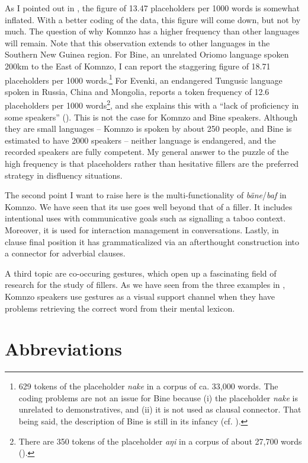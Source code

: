 \documentclass[output=paper,colorlinks,citecolor=brown]{langscibook}
\begin{document}
As I pointed out in , the figure of 13.47 placeholders per 1000 words is somewhat inflated. With a better coding of the data, this figure will come down, but not by much. The question of why Komnzo has a higher frequency than other languages will remain. Note that this observation extends to other languages in the Southern New Guinea region. For Bine, an unrelated Oriomo language spoken 200km to the East of Komnzo, I can report the staggering figure of 18.71 placeholders per 1000 words.\footnote{629 tokens of the placeholder \textit{nake} in a corpus of ca. 33,000 words. The coding problems are not an issue for Bine because (i) the placeholder \textit{nake} is unrelated to demonstratives, and (ii) it is not used as clausal connector. That being said, the description of Bine is still in its infancy (cf. \cite{Dohler:0tp}).} For Evenki, an endangered Tungusic language spoken in Russia, China and Mongolia, \textcite{Klyachko:2022ol} reports a token frequency of 12.6 placeholders per 1000 words\footnote{There are 350 tokens of the placeholder \textit{aŋi} in a corpus of about 27,700 words (\cite[213]{Klyachko:2022ol}).}, and she explains this with a ``lack of proficiency in some speakers'' (\citeyear[213]{Klyachko:2022ol}). This is not the case for Komnzo and Bine speakers. Although they are small languages -- Komnzo is spoken by about 250 people, and Bine is estimated to have 2000 speakers -- neither language is endangered, and the recorded speakers are fully competent. My general answer to the puzzle of the high frequency is that placeholders rather than hesitative fillers are the preferred strategy in disfluency situations.

The second point I want to raise here is the multi-functionality of \textit{bäne}/\textit{baf} in Komnzo. We have seen that its use goes well beyond that of a filler. It includes intentional uses with communicative goals such as signalling a taboo context. Moreover, it is used for interaction management in conversations. Lastly, in clause final position it has grammaticalized via an afterthought construction into a connector for adverbial clauses.

A third topic are co-occuring gestures, which open up a fascinating field of research for the study of fillers. As we have seen from the three examples in , Komnzo speakers use gestures as a visual support channel when they have problems retrieving the correct word from their mental lexicon.

\section*{Abbreviations}
\end{document}
